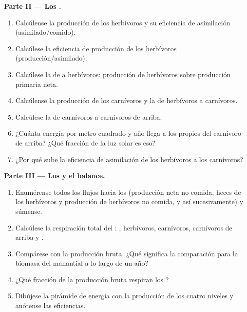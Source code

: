 \begin{problem}
\medskip
\noindent\textbf{Parte II --- Los .}
\begin{enumerate}[resume]
  \item Calcúlense la producción de los herbívoros y su eficiencia de
        asimilación (asimilado/comido).
  \item Calcúlese la eficiencia de producción de los herbívoros
        (producción/asimilado).
  \item Calcúlese la  de  a herbívoros:
        producción de herbívoros sobre producción primaria neta.
  \item Calcúlense la producción de los carnívoros y la 
        de herbívoros a carnívoros.
  \item Calcúlese la  de carnívoros a carnívoros de
        arriba.
  \item ¿Cuánta energía por metro cuadrado y año llega a los propios 
        del carnívoro de arriba? ¿Qué fracción de la luz solar es eso?
  \item ¿Por qué sube la eficiencia de asimilación de los herbívoros a los
        carnívoros?
\end{enumerate}

\medskip
\noindent\textbf{Parte III --- Los  y el balance.}
\begin{enumerate}[resume]
  \item Enumérense todos los flujos hacia los  (producción
        neta no comida, heces de los herbívoros y producción de herbívoros
        no comida, y así sucesivamente) y súmense.
  \item Calcúlese la respiración total del : ,
        herbívoros, carnívoros, carnívoros de arriba y .
  \item Compárese con la producción bruta. ¿Qué significa la comparación
        para la biomasa del manantial a lo largo de un año?
  \item ¿Qué fracción de la producción bruta respiran los ?
  \item Dibújese la pirámide de energía con la producción de los cuatro
        niveles y anótense las eficiencias.
\end{enumerate}


\end{problem}
